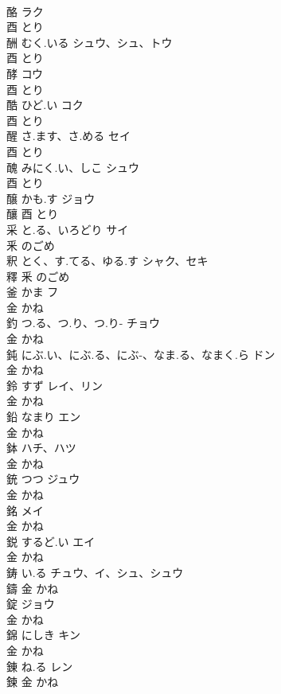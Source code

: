 \documentclass[8pt]{extreport}
\begin{document}
\begin{CJK}{UTF8}{min}
\\	酪		ラク	
\\	酉		とり		
\\	酬	むく.いる	シュウ、シュ、トウ	
\\	酉		とり		
\\	酵		コウ	
\\	酉		とり		
\\	酷	ひど.い	コク	
\\	酉		とり		
\\	醒	さ.ます、さ.める	セイ	
\\	酉		とり		
\\	醜	みにく.い、しこ	シュウ	
\\	酉		とり		
\\	醸	かも.す	ジョウ	
\\	釀	酉		とり		
\\	采	と.る、いろどり	サイ	
\\	釆		のごめ		
\\	釈	とく、す.てる、ゆる.す	シャク、セキ	
\\	釋	釆		のごめ		
\\	釜	かま	フ	
\\	金		かね		
\\	釣	つ.る、つ.り、つ.り-	チョウ	
\\	金		かね		
\\	鈍	にぶ.い、にぶ.る、にぶ-、なま.る、なまく.ら	ドン	
\\	金		かね		
\\	鈴	すず	レイ、リン	
\\	金		かね		
\\	鉛	なまり	エン	
\\	金		かね		
\\	鉢		ハチ、ハツ	
\\	金		かね		
\\	銃	つつ	ジュウ	
\\	金		かね		
\\	銘		メイ	
\\	金		かね		
\\	鋭	するど.い	エイ	
\\	金		かね		
\\	鋳	い.る	チュウ、イ、シュ、シュウ	
\\	鑄	金		かね		
\\	錠		ジョウ	
\\	金		かね		
\\	錦	にしき	キン	
\\	金		かね		
\\	錬	ね.る	レン	
\\	鍊	金		かね		

\end{CJK}
\end{document}
